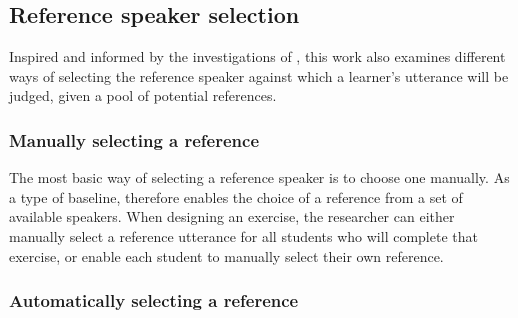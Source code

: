	

	\subsection{Reference speaker selection}
	\label{sec:compare:selection}	
	
	Inspired and informed by the investigations of \textcite{Probst2002}, this work also examines different ways of selecting the reference speaker against which a learner's utterance will be judged, given a pool of potential references. 
	
	
		\subsubsection{Manually selecting a reference}
		\label{sec:selection:manual}
		
		The most basic way of selecting a reference speaker is to choose one manually.
As a type of baseline,  therefore enables the choice of a reference from a set of available speakers.
	 When designing an exercise, the researcher can either manually select a reference utterance for all students who will complete that exercise,
	 or enable each student to manually select their own reference. 
		
	
		\subsubsection{Automatically selecting a reference}
		\label{sec:selection:auto}
		
